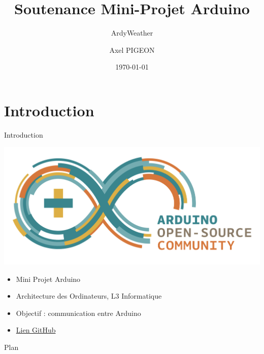 \documentclass{beamer}
\title[]{Soutenance Mini-Projet Arduino}
\subtitle{ArdyWeather}
\author{Axel PIGEON}
\institute{INU Champollion}
\date{\today}
\begin{document}
{
    \begin{frame}
        \titlepage
    \end{frame}
}


\section{Introduction}

\begin{frame}{Introduction}
    \begin{minipage}{0.40\textwidth}
        \centering
        \includegraphics[width=1.0\textwidth]{./images/logo_arduino.png}
    \end{minipage}
    \hfill 
    \begin{minipage}{0.55\textwidth}
        \begin{itemize}
            \item Mini Projet Arduino 
            \item Architecture des Ordinateurs, L3 Informatique
            \item Objectif : communication entre Arduino
            \item \href{https://github.com/winston2968/ArdyWeather.git}{Lien GitHub}
        \end{itemize}
    \end{minipage}
\end{frame}

\begin{frame}{Plan}
    \tableofcontents
\end{frame}

\end{document}
